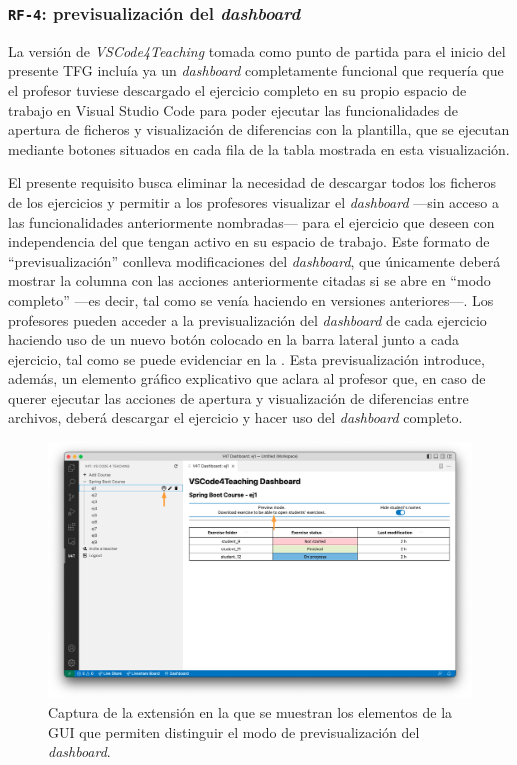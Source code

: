 \subsubsection{\texttt{RF-4}: previsualización del \textit{dashboard}}
\label{subsec:rf4}

La versión de \textit{VSCode4Teaching} tomada como punto de partida para el inicio del presente TFG incluía ya un \textit{dashboard} completamente funcional que requería que el profesor tuviese descargado el ejercicio completo en su propio espacio de trabajo en Visual Studio Code para poder ejecutar las funcionalidades de apertura de ficheros y visualización de diferencias con la plantilla, que se ejecutan mediante botones situados en cada fila de la tabla mostrada en esta visualización.

El presente requisito busca eliminar la necesidad de descargar todos los ficheros de los ejercicios y permitir a los profesores visualizar el \textit{dashboard} ---sin acceso a las funcionalidades anteriormente nombradas--- para el ejercicio que deseen con independencia del que tengan activo en su espacio de trabajo. Este formato de ``previsualización'' conlleva modificaciones del \textit{dashboard}, que únicamente deberá mostrar la columna con las acciones anteriormente citadas si se abre en ``modo completo'' ---es decir, tal como se venía haciendo en versiones anteriores---. Los profesores pueden acceder a la previsualización del \textit{dashboard} de cada ejercicio haciendo uso de un nuevo botón colocado en la barra lateral junto a cada ejercicio, tal como se puede evidenciar en la . Esta previsualización introduce, además, un elemento gráfico explicativo que aclara al profesor que, en caso de querer ejecutar las acciones de apertura y visualización de diferencias entre archivos, deberá descargar el ejercicio y hacer uso del \textit{dashboard} completo.

\begin{figure}[ht]
    \centering
    \includegraphics[width=\textwidth]{imagenes/utilizadas/4-3-implementacion/rf4-1.png}
    \caption{Captura de la extensión en la que se muestran los elementos de la GUI que permiten distinguir el modo de previsualización del \textit{dashboard}.}
    \label{fig:reqf4-1}
\end{figure}
